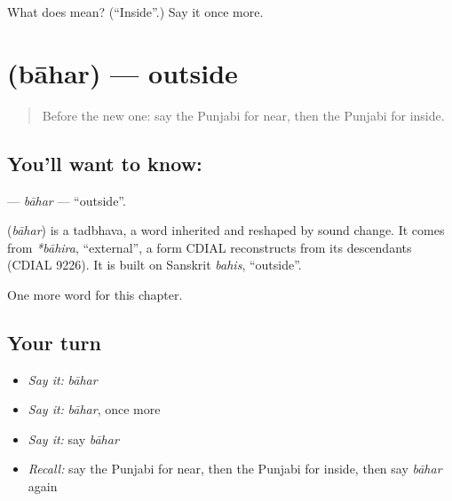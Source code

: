 \begin{tcolorbox}[breakable,colback=teal!4,colframe=teal!35!black,title={Before you move on}]
What does  mean? (\textquotedblleft{}Inside\textquotedblright{}.) Say it once more.
\end{tcolorbox}
\section[\texorpdfstring{\pa{ਬਾਹਰ} (bāhar)}{ਬਾਹਰ (bāhar)}]{ (bāhar) — outside}

\label{lesson:PA-C88-bahar}



\begin{quote}
Before the new one: say the Punjabi for near, then the Punjabi for inside.
\end{quote}

\subsection*{You'll want to know: }
\textbf{} — \emph{bāhar} — \textquotedblleft{}outside\textquotedblright{}.

\begin{cousinweb}
\textbf{} (\emph{bāhar}) is a tadbhava, a word inherited and reshaped by sound change. It comes from \emph{*bāhira}, \textquotedblleft{}external\textquotedblright{}, a form CDIAL reconstructs from its descendants (CDIAL 9226). It is built on Sanskrit \emph{bahis}, \textquotedblleft{}outside\textquotedblright{}.
\end{cousinweb}

\begin{grammarlens}[title={What you've built}]
One more word for this chapter.
\end{grammarlens}

\subsection*{Your turn}
\begin{itemize}
\raggedright
  \item \emph{Say it:} \emph{bāhar}
  \item \emph{Say it:} \emph{bāhar}, once more
  \item \emph{Say it:} say \emph{bāhar}
  \item \emph{Recall:} say the Punjabi for near, then the Punjabi for inside, then say \emph{bāhar} again
\end{itemize}

